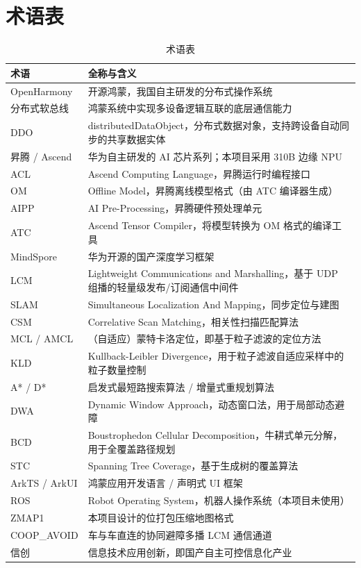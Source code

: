 ﻿%
\chapter{术语表}
\label{app:glossary}

\begin{table}[htbp]
\centering
\caption{术语表}
\label{tab:glossary}
\small
\begin{tabularx}{\textwidth}{p{3cm}X}
\toprule
\textbf{术语} & \textbf{全称与含义} \\
\midrule
OpenHarmony & 开源鸿蒙，我国自主研发的分布式操作系统 \\
分布式软总线 & 鸿蒙系统中实现多设备逻辑互联的底层通信能力 \\
DDO & distributedDataObject，分布式数据对象，支持跨设备自动同步的共享数据实体 \\
昇腾 / Ascend & 华为自主研发的 AI 芯片系列；本项目采用 310B 边缘 NPU \\
ACL & Ascend Computing Language，昇腾运行时编程接口 \\
OM & Offline Model，昇腾离线模型格式（由 ATC 编译器生成） \\
AIPP & AI Pre-Processing，昇腾硬件预处理单元 \\
ATC & Ascend Tensor Compiler，将模型转换为 OM 格式的编译工具 \\
MindSpore & 华为开源的国产深度学习框架 \\
LCM & Lightweight Communications and Marshalling，基于 UDP 组播的轻量级发布/订阅通信中间件 \\
SLAM & Simultaneous Localization And Mapping，同步定位与建图 \\
CSM & Correlative Scan Matching，相关性扫描匹配算法 \\
MCL / AMCL & （自适应）蒙特卡洛定位，即基于粒子滤波的定位方法 \\
KLD & Kullback-Leibler Divergence，用于粒子滤波自适应采样中的粒子数量控制 \\
A* / D* & 启发式最短路搜索算法 / 增量式重规划算法 \\
DWA & Dynamic Window Approach，动态窗口法，用于局部动态避障 \\
BCD & Boustrophedon Cellular Decomposition，牛耕式单元分解，用于全覆盖路径规划 \\
STC & Spanning Tree Coverage，基于生成树的覆盖算法 \\
ArkTS / ArkUI & 鸿蒙应用开发语言 / 声明式 UI 框架 \\
ROS & Robot Operating System，机器人操作系统（本项目未使用） \\
ZMAP1 & 本项目设计的位打包压缩地图格式 \\
COOP\_AVOID & 车与车直连的协同避障多播 LCM 通信通道 \\
信创 & 信息技术应用创新，即国产自主可控信息化产业 \\
\bottomrule
\end{tabularx}
\end{table}
